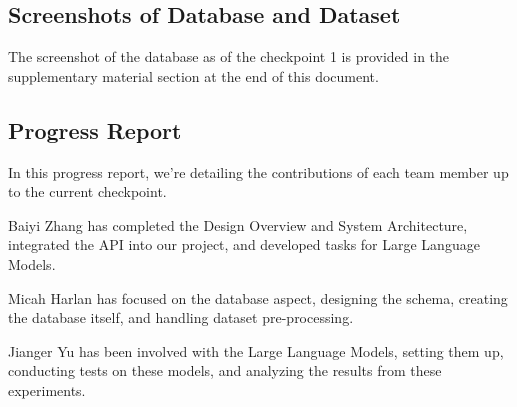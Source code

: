 \documentclass[journal]{IEEEtran}
\theoremstyle{mydefstyle}
\begin{document}
\subsection{Screenshots of Database and Dataset}
The screenshot of the database as of the checkpoint 1 is provided in the supplementary material section at the end of this document.

\subsection{Progress Report}
In this progress report, we're detailing the contributions of each team member up to the current checkpoint.

Baiyi Zhang has completed the Design Overview and System Architecture, integrated the API into our project, and developed tasks for Large Language Models.

Micah Harlan has focused on the database aspect, designing the schema, creating the database itself, and handling dataset pre-processing.

Jianger Yu has been involved with the Large Language Models, setting them up, conducting tests on these models, and analyzing the results from these experiments.
\end{document}
